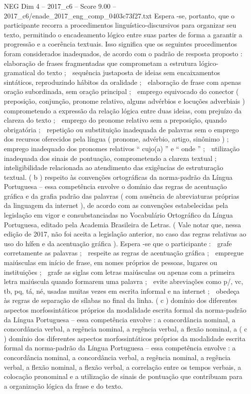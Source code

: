 \begin{textsample}{NEG Dim 4 – 2017\_c6 – Score 9.00 – 2017\_c6/enade\_2017\_eng\_comp\_0403c73f27.txt}
Espera -se, portanto, que o participante recorra a procedimentos linguístico-discursivos para organizar seu texto, permitindo o encadeamento lógico entre suas partes de forma a garantir a progressão e a coerência textuais.
Isso significa que os seguintes procedimentos foram considerados inadequados, de acordo com o padrão de resposta proposto :  elaboração de frases fragmentadas que comprometam a estrutura lógico-gramatical do texto ;  sequência justaposta de ideias sem encaixamentos sintáticos, reproduzindo hábitos da oralidade ;  elaboração de frase com apenas oração subordinada, sem oração principal ;  emprego equivocado do conector ( preposição, conjunção, pronome relativo, alguns advérbios e locuções adverbiais ) comprometendo a expressão da relação lógica entre duas ideias, com prejuízo da clareza do texto ;  emprego do pronome relativo sem a preposição, quando obrigatória ;  repetição ou substituição inadequada de palavras sem o emprego dos recursos oferecidos pela língua ( pronome, advérbio, artigo, sinônimo ) ;  emprego inadequado dos pronomes relativos “ cujo(a) ” e “ onde ” ;  utilização inadequada dos sinais de pontuação, comprometendo a clareza textual ;  inteligibilidade relacionada ao atendimento das exigências de estruturação textual. ( b ) respeito às convenções ortográficas da norma-padrão da Língua Portuguesa – essa competência envolve o domínio das regras de acentuação gráfica e da grafia padrão das palavras ( com ausência de abreviaturas próprias da linguagem da internet ), de acordo com as convenções estabelecidas pela legislação em vigor e consubstanciadas no Vocabulário Ortográfico da Língua Portuguesa, editado pela Academia Brasileira de Letras. ( Vale notar que, nessa edição de 2017, não foi aceita a legislação anterior, no caso das regras relativas ao uso do hífen e da acentuação gráfica ).
Espera -se que o participante :  grafe corretamente as palavras ;  respeite as regras de acentuação gráfica ;  empregue maiúsculas em início de frase, em nomes próprios de pessoas, lugares ou instituições ;  grafe as siglas com letras maiúsculas ou apenas com a primeira letra maiúscula quando formarem uma palavra ;  evite abreviações como p/, vc, tb, pq, tá, né, usadas muitas vezes em escrita informal e na internet ;  obedeça às regras de separação de sílabas no final da linha. ( c ) domínio dos diferentes aspectos morfossintáticos próprios da modalidade escrita formal da norma-padrão da Língua Portuguesa – essa competência envolve : a concordância nominal, a concordância verbal, a regência nominal, a regência verbal, a flexão nominal, a ( c ) domínio dos diferentes aspectos morfossintáticos próprios da modalidade escrita formal da norma-padrão da Língua Portuguesa – essa competência envolve : a concordância nominal, a concordância verbal, a regência nominal, a regência verbal, a flexão nominal, a flexão verbal, a correlação entre os tempos verbais, a colocação pronominal e a utilização de sinais de pontuação que contribuam para a organização lógica da frase e do texto.

\end{textsample}
